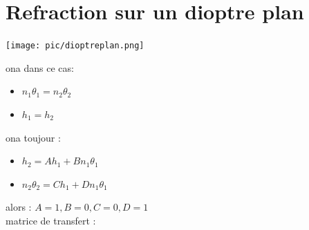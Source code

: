\documentclass[12pt]{book}
\begin{document}
        \section{Refraction sur un dioptre plan}
            \begin{center}
                \texttt{[image: pic/dioptreplan.png]}
            \end{center}
            \begin{center}
                \begin{minipage}{0.49\linewidth}
                    ona dans ce cas:
                    \begin{itemize}
                        \item $n_1\theta_1 = n_2\theta_2$
                        \item $h_1 = h_2$
                    \end{itemize}
                    
                \end{minipage}
                \begin{minipage}{0.49\linewidth}
                    ona toujour :
                    \begin{itemize}
                        \item $ h_2 = Ah_1 + Bn_1\theta_1$
                        \item $ n_2\theta_2 = Ch_1 + Dn_1\theta_1$
                    \end{itemize}
                    
                \end{minipage}
            \end{center}
            alors : $ A = 1 , B = 0 ,C = 0 , D = 1$ \\ 
            matrice de transfert : 
            \begin{center}
            \end{center}
            
\end{document}
